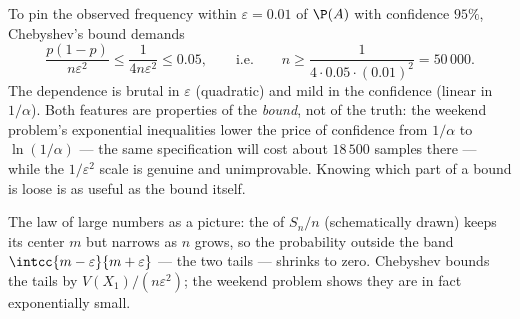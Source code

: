 \begin{example}\label{ex:b2:randomvar:llnnumeric}
To pin the observed frequency within $\varepsilon = 0.01$ of
$\P(A)$ with confidence $95\%$, Chebyshev's bound demands
\[
\frac{p(1-p)}{n\varepsilon^2} \leq \frac{1}{4n\varepsilon^2}
\leq 0.05,
\qquad\text{i.e.}\qquad
n \geq \frac{1}{4\cdot0.05\cdot(0.01)^2} = 50\,000 .
\]
The dependence is brutal in $\varepsilon$ (quadratic) and
mild in the confidence (linear in $1/\alpha$). Both features
are properties of the \emph{bound}, not of the truth: the
weekend problem's exponential inequalities lower the price of
confidence from $1/\alpha$ to $\ln(1/\alpha)$ --- the same
specification will cost about $18\,500$ samples there ---
while the $1/\varepsilon^2$ scale is genuine and
unimprovable. Knowing which part of a bound is loose is as
useful as the bound itself.
\end{example}

\begin{omfigure}

{\small The law of large numbers as a picture: the  of
$S_n/n$ (schematically drawn) keeps its center $m$ but
narrows as $n$ grows, so the probability outside the band
$\intcc{m-\varepsilon}{m+\varepsilon}$ --- the two tails ---
shrinks to zero. Chebyshev bounds the tails by
$V(X_1)/(n\varepsilon^2)$; the weekend problem shows they are
in fact exponentially small.}
\end{omfigure}

